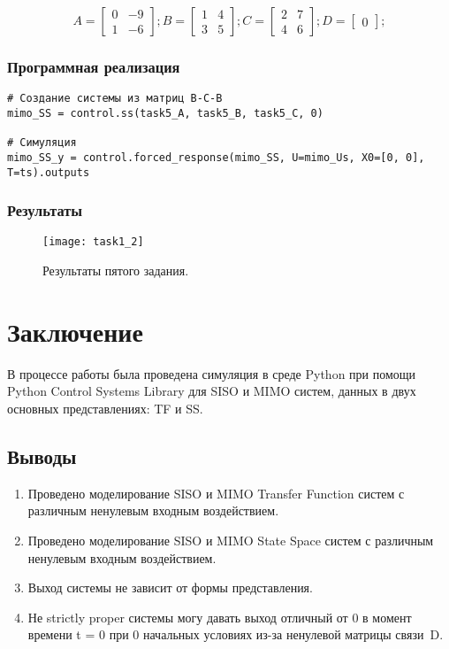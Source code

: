 \documentclass[16pt]{article}
\begin{document}
\[ 
    A = \begin{bmatrix}
        0 &  -9 \\
        1 &  -6 
        \end{bmatrix};
        B = \begin{bmatrix}
            1 & 4 \\
            3 & 5
            \end{bmatrix};
        C = \begin{bmatrix}
            2 & 7 \\
            4 & 6
            \end{bmatrix};
        D = \begin{bmatrix}
            0
            \end{bmatrix};
\]

\subsubsection{Программная реализация}
\begin{verbatim}
# Создание системы из матриц В-С-В
mimo_SS = control.ss(task5_A, task5_B, task5_C, 0)

# Симуляция
mimo_SS_y = control.forced_response(mimo_SS, U=mimo_Us, X0=[0, 0], T=ts).outputs
\end{verbatim}

\subsubsection{Результаты}
\begin{figure}[H]
	\centering
	\texttt{[image: task1\_2]}
	\caption{Результаты пятого задания.}
	\label{fig:fig5}
\end{figure}

\newpage
\section{Заключение}
В процессе работы была проведена симуляция в среде Python при помощи Python Control Systems Library для SISO и MIMO систем, данных в двух основных представлениях: TF и SS.
\subsection{Выводы}
\begin{enumerate}
   \item Проведено моделирование SISO и MIMO Transfer Function систем с различным ненулевым входным воздействием.
   \item Проведено моделирование SISO и MIMO State Space систем с различным ненулевым входным воздействием.
   \item Выход системы не зависит от формы представления.
   \item Не strictly proper системы могу давать выход отличный от 0 в момент времени t = 0 при 0 начальных условиях из-за ненулевой матрицы связи~D. 
\end{enumerate}
\end{document}
